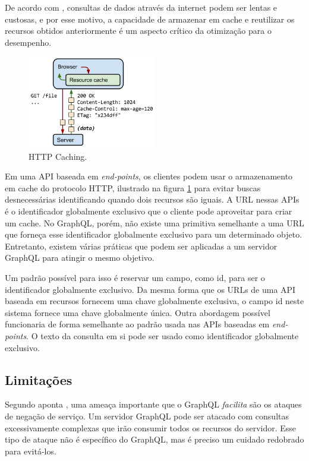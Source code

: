 De acordo com , consultas de dados através da internet podem ser lentas e custosas, e por esse motivo, a capacidade de armazenar em cache e reutilizar os recursos obtidos anteriormente é um aspecto crítico da otimização para o desempenho.

\begin{figure}[htbp]
\centering
\includegraphics[width=0.5\textwidth]{figuras/cache-http.png}
\caption{HTTP Caching.}
\label{fig:cache-http}
\end{figure}

Em uma API baseada em \textit{end-points}, os clientes podem usar o armazenamento em cache do protocolo HTTP, ilustrado na figura \ref{fig:cache-http} para evitar buscas desnecessárias identificando quando dois recursos são iguais. A URL nessas APIs é o identificador globalmente exclusivo que o cliente pode aproveitar para criar um cache. No GraphQL, porém, não existe uma primitiva semelhante a uma URL que forneça esse identificador globalmente exclusivo para um determinado objeto. Entretanto, existem várias práticas que podem ser aplicadas a um servidor GraphQL para atingir o mesmo objetivo.

Um padrão possível para isso é reservar um campo, como \textup{id}, para ser o identificador globalmente exclusivo. Da mesma forma que os URLs de uma API baseada em recursos fornecem uma chave globalmente exclusiva, o campo \textup{id} neste sistema fornece uma chave globalmente única. Outra abordagem possível funcionaria de forma semelhante ao padrão usada nas APIs baseadas em \textit{end-points}. O texto da consulta em si pode ser usado como identificador globalmente exclusivo. 

\subsection{Limitações}

Segundo aponta , uma ameaça importante que o GraphQL \emph{facilita} são os ataques de negação de serviço. Um servidor GraphQL pode ser atacado com consultas excessivamente complexas que irão consumir todos os recursos do servidor. Esse tipo de ataque não é específico do GraphQL, mas é preciso um cuidado redobrado para evitá-los.

